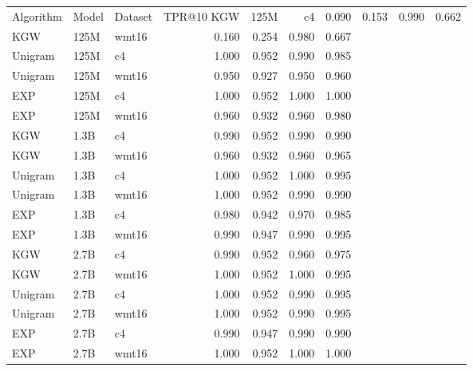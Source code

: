 \begin{tabular}{lllrrrr}
\toprule
Algorithm & Model & Dataset & TPR@10%
\midrule
KGW & 125M & c4 & 0.090 & 0.153 & 0.990 & 0.662 \\
KGW & 125M & wmt16 & 0.160 & 0.254 & 0.980 & 0.667 \\
Unigram & 125M & c4 & 1.000 & 0.952 & 0.990 & 0.985 \\
Unigram & 125M & wmt16 & 0.950 & 0.927 & 0.950 & 0.960 \\
EXP & 125M & c4 & 1.000 & 0.952 & 1.000 & 1.000 \\
EXP & 125M & wmt16 & 0.960 & 0.932 & 0.960 & 0.980 \\
KGW & 1.3B & c4 & 0.990 & 0.952 & 0.990 & 0.990 \\
KGW & 1.3B & wmt16 & 0.960 & 0.932 & 0.960 & 0.965 \\
Unigram & 1.3B & c4 & 1.000 & 0.952 & 1.000 & 0.995 \\
Unigram & 1.3B & wmt16 & 1.000 & 0.952 & 0.990 & 0.990 \\
EXP & 1.3B & c4 & 0.980 & 0.942 & 0.970 & 0.985 \\
EXP & 1.3B & wmt16 & 0.990 & 0.947 & 0.990 & 0.995 \\
KGW & 2.7B & c4 & 0.990 & 0.952 & 0.960 & 0.975 \\
KGW & 2.7B & wmt16 & 1.000 & 0.952 & 1.000 & 0.995 \\
Unigram & 2.7B & c4 & 1.000 & 0.952 & 0.990 & 0.995 \\
Unigram & 2.7B & wmt16 & 1.000 & 0.952 & 0.990 & 0.995 \\
EXP & 2.7B & c4 & 0.990 & 0.947 & 0.990 & 0.990 \\
EXP & 2.7B & wmt16 & 1.000 & 0.952 & 1.000 & 1.000 \\
\bottomrule
\end{tabular}
